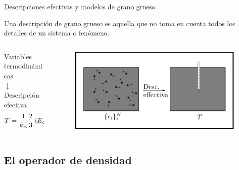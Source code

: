 \begin{frame}{Descripciones efectivas y modelos de grano grueso}
    \begin{center}
        Una descripción de grano grueso es aquella que no toma en cuenta todos los detalles de un sistema o fenómeno.
    \end{center}
    \pause
    \begin{columns}
        \begin{column}{0.5\textwidth}
            \begin{center}
                Variables termodinámicas\\
                $\downarrow$\\
                Descripción efectiva\\
                \pause
                \begin{equation}
                    T=\frac{1}{k_\text{B}}\frac{2}{3}\expval{E_{\text{cin}}}.\nonumber
                \end{equation}
            \end{center}
        \end{column}
        \begin{column}{0.5\textwidth}
            \begin{figure}
                \includegraphics[width=1\textwidth]{figures/CGT.png}
            \end{figure}
        \end{column}
    \end{columns}
\end{frame}


\subsection{El operador de densidad}

